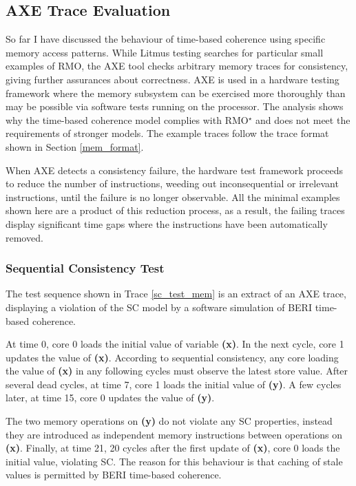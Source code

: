 	\subsection{AXE Trace Evaluation}
		So far I have discussed the behaviour of time-based coherence using specific memory access patterns. While Litmus testing searches for particular
		small examples of RMO, the AXE tool checks
		arbitrary memory traces for consistency, giving further assurances
		about correctness. AXE is used in a hardware testing
		framework where the memory subsystem can be exercised more thoroughly
		than may be possible via software tests running on the processor. The analysis shows why the time-based coherence model complies with RMO{\large$^\star$} and does not meet the requirements of stronger models. The example traces follow the trace format shown in Section \ref{mem_format}.
		
		When AXE detects a consistency failure, the hardware test framework
		proceeds to reduce the number of instructions, weeding out inconsequential or irrelevant instructions, until the failure is no longer observable. All the minimal examples shown here are a product of this reduction process, as a result, the failing traces display significant time gaps where the
		instructions have been automatically removed.

		\subsubsection{Sequential Consistency Test}
			The test sequence shown in Trace \ref{sc_test_mem} is an extract of an AXE trace, displaying a violation of the SC model by a software simulation of BERI time-based coherence. 
			
			At time 0, core 0 loads the initial value of variable \textbf{(x)}. In the next cycle, core 1 updates the value of \textbf{(x)}. According to sequential consistency, any core loading the value of \textbf{(x)} in any following cycles must observe the latest store value. After several dead cycles, at time 7, core 1 loads the initial value of \textbf{(y)}. A few cycles later, at time 15, core 0 updates the value of \textbf{(y)}. 
			
			The two memory operations on \textbf{(y)} do not violate any SC properties, instead they are introduced as independent memory instructions between operations on \textbf{(x)}. Finally, at time 21, 20 cycles after the first update of \textbf{(x)}, core 0 loads the initial value, violating SC. The reason for this behaviour is that caching of stale values is permitted by BERI time-based coherence.
			
